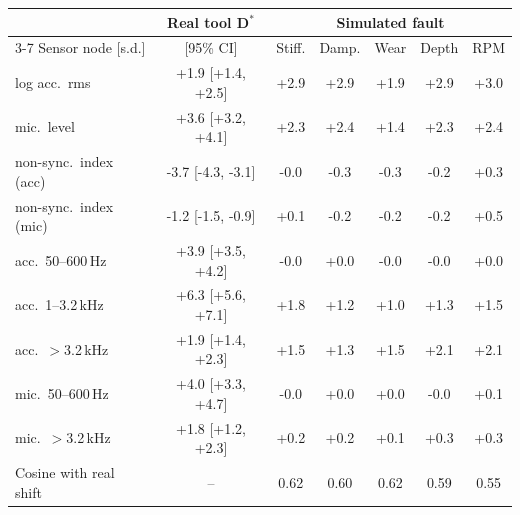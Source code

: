 \begin{tabular}{lcccccc}
\toprule
& Real tool D$^*$ & \multicolumn{5}{c}{Simulated fault} \\
\cmidrule(lr){3-7}
Sensor node [s.d.] & [95\% CI] & Stiff. & Damp. & Wear & Depth & RPM \\
\midrule
log acc.\ rms & +1.9 [+1.4, +2.5] & \cellcolor{red!18}+2.9 & \cellcolor{red!18}+2.9 & +1.9 & \cellcolor{red!18}+2.9 & \cellcolor{red!18}+3.0 \\
mic.\ level & \cellcolor{red!18}+3.6 [+3.2, +4.1] & \cellcolor{red!18}+2.3 & \cellcolor{red!18}+2.4 & +1.4 & \cellcolor{red!18}+2.3 & \cellcolor{red!18}+2.4 \\
non-sync.\ index (acc) & \cellcolor{blue!15}-3.7 [-4.3, -3.1] & -0.0 & -0.3 & -0.3 & -0.2 & +0.3 \\
non-sync.\ index (mic) & -1.2 [-1.5, -0.9] & +0.1 & -0.2 & -0.2 & -0.2 & +0.5 \\
acc.\ 50--600\,Hz & \cellcolor{red!18}+3.9 [+3.5, +4.2] & -0.0 & +0.0 & -0.0 & -0.0 & +0.0 \\
acc.\ 1--3.2\,kHz & \cellcolor{red!18}+6.3 [+5.6, +7.1] & +1.8 & +1.2 & +1.0 & +1.3 & +1.5 \\
acc.\ $>$3.2\,kHz & +1.9 [+1.4, +2.3] & +1.5 & +1.3 & +1.5 & \cellcolor{red!18}+2.1 & \cellcolor{red!18}+2.1 \\
mic.\ 50--600\,Hz & \cellcolor{red!18}+4.0 [+3.3, +4.7] & -0.0 & +0.0 & +0.0 & -0.0 & +0.1 \\
mic.\ $>$3.2\,kHz & +1.8 [+1.2, +2.3] & +0.2 & +0.2 & +0.1 & +0.3 & +0.3 \\
\midrule
Cosine with real shift & -- & 0.62 & 0.60 & 0.62 & 0.59 & 0.55 \\
\bottomrule
\end{tabular}
